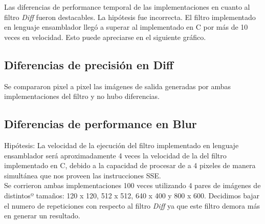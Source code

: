 \documentclass[10pt,a4paper,spanish]{article}
\begin{document}
Las diferencias de performance temporal de las implementaciones en cuanto al filtro \textit{Diff} fueron destacables. La hipótesis fue incorrecta. El filtro implementado en lenguaje ensamblador llegó a superar al implementado en C por más de 10 veces en velocidad. Esto puede apreciarse en el siguiente gráfico. \\


\subsection{Diferencias de precisión en Diff}

Se compararon pixel a pixel las imágenes de salida generadas por ambas implementaciones del filtro y no hubo diferencias.

\subsection{Diferencias de performance en Blur}

Hipótesis: La velocidad de la ejecución del filtro implementado en lenguaje ensamblador será aproximadamente 4 veces la velocidad de la del filtro implementado en C, debido a la capacidad de procesar de a 4 pixeles de manera simultánea que nos proveen las instrucciones SSE. \\

Se corrieron ambas implementaciones 100 veces utilizando 4 pares de imágenes de distintosº tamaños: 120 x 120, 512 x 512, 640 x 400 y 800 x 600. Decidimos bajar el numero de repeticiones con respecto al filtro \textit{Diff} ya que este filtro demora más en generar un resultado.\\
\end{document}
